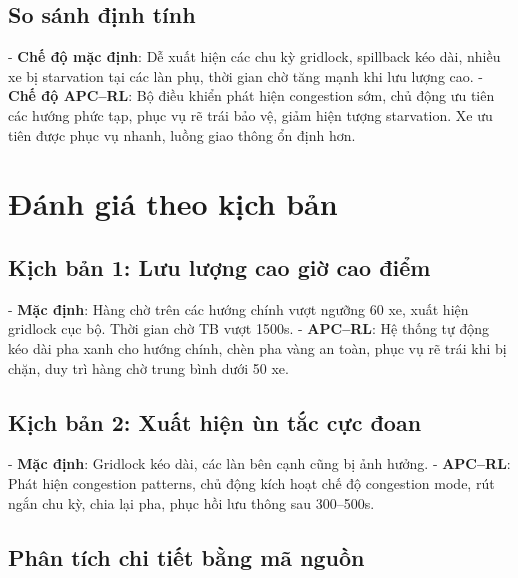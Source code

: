 \subsection{So sánh định tính}

- \textbf{Chế độ mặc định}: Dễ xuất hiện các chu kỳ gridlock, spillback kéo dài, nhiều xe bị starvation tại các làn phụ, thời gian chờ tăng mạnh khi lưu lượng cao.
- \textbf{Chế độ APC–RL}: Bộ điều khiển phát hiện congestion sớm, chủ động ưu tiên các hướng phức tạp, phục vụ rẽ trái bảo vệ, giảm hiện tượng starvation. Xe ưu tiên được phục vụ nhanh, luồng giao thông ổn định hơn.

\section{Đánh giá theo kịch bản}

\subsection{Kịch bản 1: Lưu lượng cao giờ cao điểm}

- \textbf{Mặc định}: Hàng chờ trên các hướng chính vượt ngưỡng 60 xe, xuất hiện gridlock cục bộ. Thời gian chờ TB vượt 1500s.
- \textbf{APC–RL}: Hệ thống tự động kéo dài pha xanh cho hướng chính, chèn pha vàng an toàn, phục vụ rẽ trái khi bị chặn, duy trì hàng chờ trung bình dưới 50 xe.

\subsection{Kịch bản 2: Xuất hiện ùn tắc cực đoan}

- \textbf{Mặc định}: Gridlock kéo dài, các làn bên cạnh cũng bị ảnh hưởng.
- \textbf{APC–RL}: Phát hiện congestion patterns, chủ động kích hoạt chế độ congestion mode, rút ngắn chu kỳ, chia lại pha, phục hồi lưu thông sau 300–500s.

\subsection{Phân tích chi tiết bằng mã nguồn}

